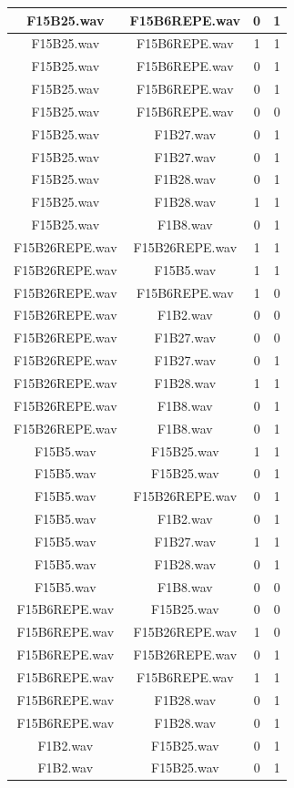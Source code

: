 \documentclass[11pt,a4paper]{book}
\begin{document}
\begin{longtable}[c]{|c|c|c|c|}
		F15B25.wav&F15B6REPE.wav&0&1\\ \hline
F15B25.wav&F15B6REPE.wav&1&1\\ \hline
F15B25.wav&F15B6REPE.wav&0&1\\ \hline
F15B25.wav&F15B6REPE.wav&0&1\\ \hline
F15B25.wav&F15B6REPE.wav&0&0\\ \hline
F15B25.wav&F1B27.wav&0&1\\ \hline
F15B25.wav&F1B27.wav&0&1\\ \hline
F15B25.wav&F1B28.wav&0&1\\ \hline
F15B25.wav&F1B28.wav&1&1\\ \hline
F15B25.wav&F1B8.wav&0&1\\ \hline
F15B26REPE.wav&F15B26REPE.wav&1&1\\ \hline
F15B26REPE.wav&F15B5.wav&1&1\\ \hline
F15B26REPE.wav&F15B6REPE.wav&1&0\\ \hline
F15B26REPE.wav&F1B2.wav&0&0\\ \hline
F15B26REPE.wav&F1B27.wav&0&0\\ \hline
F15B26REPE.wav&F1B27.wav&0&1\\ \hline
F15B26REPE.wav&F1B28.wav&1&1\\ \hline
F15B26REPE.wav&F1B8.wav&0&1\\ \hline
F15B26REPE.wav&F1B8.wav&0&1\\ \hline
F15B5.wav&F15B25.wav&1&1\\ \hline
F15B5.wav&F15B25.wav&0&1\\ \hline
F15B5.wav&F15B26REPE.wav&0&1\\ \hline
F15B5.wav&F1B2.wav&0&1\\ \hline
F15B5.wav&F1B27.wav&1&1\\ \hline
F15B5.wav&F1B28.wav&0&1\\ \hline
F15B5.wav&F1B8.wav&0&0\\ \hline
F15B6REPE.wav&F15B25.wav&0&0\\ \hline
F15B6REPE.wav&F15B26REPE.wav&1&0\\ \hline
F15B6REPE.wav&F15B26REPE.wav&0&1\\ \hline
F15B6REPE.wav&F15B6REPE.wav&1&1\\ \hline
F15B6REPE.wav&F1B28.wav&0&1\\ \hline
F15B6REPE.wav&F1B28.wav&0&1\\ \hline
F1B2.wav&F15B25.wav&0&1\\ \hline
F1B2.wav&F15B25.wav&0&1\\ \hline

\end{longtable}
\end{document}
